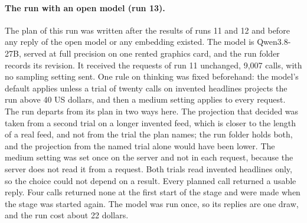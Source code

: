 \paragraph{The run with an open model (run 13).} The plan of this run was written after the results of runs 11 and 12 and before any reply of the open model or any embedding existed. The model is Qwen3.8-27B, served at full precision on one rented graphics card, and the run folder records its revision. It received the requests of run 11 unchanged, 9,007 calls, with no sampling setting sent. One rule on thinking was fixed beforehand: the model's default applies unless a trial of twenty calls on invented headlines projects the run above 40 US dollars, and then a medium setting applies to every request. The run departs from its plan in two ways here. The projection that decided was taken from a second trial on a longer invented feed, which is closer to the length of a real feed, and not from the trial the plan names; the run folder holds both, and the projection from the named trial alone would have been lower. The medium setting was set once on the server and not in each request, because the server does not read it from a request. Both trials read invented headlines only, so the choice could not depend on a result. Every planned call returned a usable reply. Four calls returned none at the first start of the stage and were made when the stage was started again. The model was run once, so its replies are one draw, and the run cost about 22 dollars.

